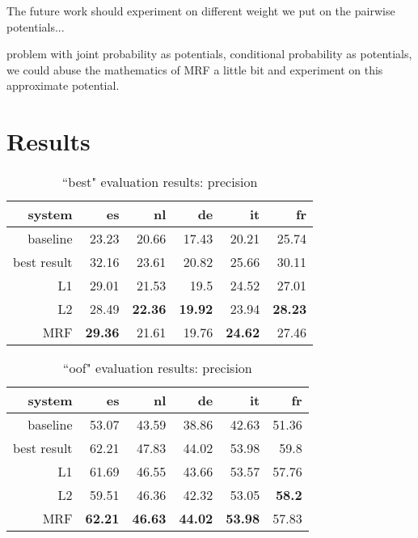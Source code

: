 \documentclass[11pt,letterpaper]{article}
\begin{document}
The future work should experiment on different weight we put on the pairwise
potentials...

problem with joint probability as potentials, conditional probability as
potentials, we could abuse the mathematics of MRF a little bit and experiment
on this approximate potential.

\section{Results}
\begin{table*}[t!]
  \begin{center}
    \begin{tabular}{|r|r|r|r|r|r|}
      \hline
      system   & es    & nl    & de    &  it   & fr \\
      \hline
      baseline & 23.23          & 20.66          & 17.43          & 20.21          & 25.74 \\
   best result & 32.16          & 23.61          & 20.82          & 25.66          & 30.11 \\
      \hline
            L1 & 29.01          & 21.53          & 19.5           & 24.52          & 27.01 \\
            L2 & 28.49          & \textbf{22.36} & \textbf{19.92} & 23.94          & \textbf{28.23} \\
           MRF & \textbf{29.36} & 21.61          & 19.76          & \textbf{24.62} & 27.46 \\
      \hline
    \end{tabular}
  \caption{``best" evaluation results: precision}
  \label{table:resultsbest}
  \end{center}
\end{table*}

\begin{table*}[t!]
  \begin{center}
    \begin{tabular}{|r|r|r|r|r|r|}
      \hline
      system   & es    & nl    & de    &  it   & fr \\
      \hline
      baseline & 53.07          & 43.59              & 38.86          & 42.63          & 51.36 \\
   best result & 62.21          & 47.83              & 44.02          & 53.98          & 59.8 \\
      \hline
           L1  & 61.69          & 46.55              & 43.66          & 53.57          & 57.76 \\
           L2  & 59.51          & 46.36              & 42.32          & 53.05          & \textbf{58.2} \\
           MRF & \textbf{62.21} & \textbf{46.63}     & \textbf{44.02} & \textbf{53.98} & 57.83 \\
      \hline
    \end{tabular}
  \caption{``oof" evaluation results: precision}
  \label{table:resultsbest}
  \end{center}
\end{table*}
\end{document}

